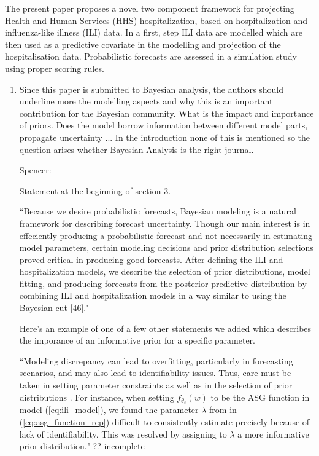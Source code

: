 \documentclass{article}
\newcommand{\spencer}[1]{{\color{blue} Spencer: #1}}
\begin{document}
The present paper proposes a novel two component framework for projecting Health 
and Human Services (HHS) hospitalization, based on hospitalization and 
influenza-like illness (ILI) data. In a first, step ILI data are modelled which 
are then used as a predictive covariate in the modelling and projection of the 
hospitalisation data. Probabilistic forecasts are assessed in a simulation study 
using proper scoring rules.


\begin{enumerate}[1.]

\item Since this paper is submitted to Bayesian analysis, the authors should 
underline more the modelling aspects and why this is an important contribution 
for the Bayesian community. What is the impact and importance of priors. Does 
the model borrow information between different model parts, propagate 
uncertainty ... In the introduction none of this is mentioned so the question 
arises whether Bayesian Analysis is the right journal.

\spencer{

Statement at the beginning of section 3.

``Because we desire probabilistic forecasts, Bayesian modeling is a 
natural framework for describing forecast uncertainty. 
Though our main interest is in effeciently producing a probabilistic 
forecast and not 
necessarily in estimating model parameters, certain modeling decisions and 
prior distribution selections proved critical in producing good 
forecasts. After defining the ILI and hospitalization models, 
we describe the 
selection of prior distributions, model fitting, and producing forecasts
from the posterior predictive distribution by combining ILI and hospitalization
models in a way similar to using the 
Bayesian cut [46]."


Here's an example of one of a 
few other statements we added which describes the imporance of 
an informative prior for a 
specific parameter.

``Modeling discrepancy can lead to 
overfitting, particularly in forecasting scenarios, and may also lead to 
identifiability issues. 
Thus, care must be taken in setting parameter constraints as well as in the 
selection of prior distributions \cite[]{osthus2019dynamic,
brynjarsdottir2014learning}. 
For instance, when setting $f_{\theta_s}(w)$ to
be the ASG function
in model (\ref{eq:ili_model}), we found the parameter $\lambda$ from 
in (\ref{eq:asg_function_rep}) difficult to consistently 
estimate precisely because of lack of identifiability. This was resolved by 
assigning to $\lambda$ a more informative prior distribution."
?? incomplete}


\end{enumerate}
\end{document}
